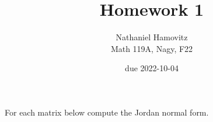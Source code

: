 \documentclass{article}
\newenvironment{problem}[2][Problem]{\begin{trivlist}
\item[\hskip \labelsep {\bfseries #1}\hskip \labelsep {\bfseries #2.}]}{\end{trivlist}}
\begin{document}


\title{Homework 1} %
\author{Nathaniel Hamovitz\\Math 119A, Nagy, F22}
\date{due 2022-10-04}

\maketitle

\begin{problem}{1}
    For each matrix below compute the Jordan normal form.
\end{problem}
\end{document}
